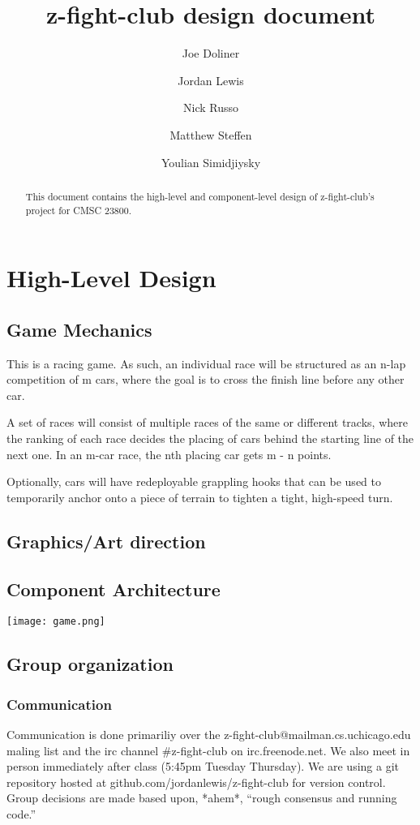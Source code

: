 \documentclass[12pt]{article}
\title{z-fight-club design document}
\author{Joe Doliner \and Jordan Lewis \and Nick Russo \and Matthew Steffen \and Youlian Simidjiysky}
\begin{document}
 \maketitle
\begin{abstract}
This document contains the high-level and component-level design of
z-fight-club's project for CMSC 23800.
\end{abstract}
\section{High-Level Design}
\subsection{Game Mechanics}
This is a racing game. As such, an individual race will be structured as
an n-lap competition of m cars, where the goal is to cross the finish line
before any other car.

A set of races will consist of multiple races of the same or different tracks,
where the ranking of each race decides the placing of cars behind the starting
line of the next one. In an m-car race, the nth placing car gets m - n points.

Optionally, cars will have redeployable grappling hooks that can be used to
temporarily anchor onto a piece of terrain to tighten a tight, high-speed turn.
\subsection{Graphics/Art direction}

\subsection{Component Architecture}
\texttt{[image: game.png]}

\subsection{Group organization}
\subsubsection{Communication}
Communication is done primariliy over the z-fight-club@mailman.cs.uchicago.edu maling list and the irc channel \#z-fight-club on irc.freenode.net.  We also meet in person immediately after class (5:45pm Tuesday Thursday).  We are using a git repository hosted at github.com/jordanlewis/z-fight-club for version control.  Group decisions are made based upon, *ahem*, ``rough consensus and running code.''
\end{document}
